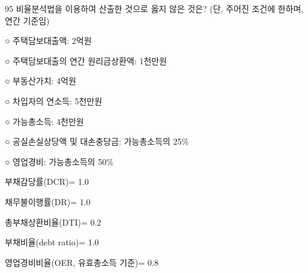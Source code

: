 \begin{question}{95}
비율분석법을 이용하여 산출한 것으로 옳지 않은 것은? (단, 주어진 조건에 한하며, 연간 기준임)
\begin{framedtext}
○ 주택담보대출액: 2억원 \par
○ 주택담보대출의 연간 원리금상환액: 1천만원 \par
○ 부동산가치: 4억원 \par
○ 차입자의 연소득: 5천만원 \par
○ 가능총소득: 4천만원 \par
○ 공실손실상당액 및 대손충당금: 가능총소득의 25\% \par
○ 영업경비: 가능총소득의 50\% \par
\end{framedtext}
\begin{choices}
  \item 부채감당률(DCR)= 1.0
  \item 채무불이행률(DR)= 1.0
  \item 총부채상환비율(DTI)= 0.2
  \item 부채비율(debt ratio)= 1.0
  \item 영업경비비율(OER, 유효총소득 기준)= 0.8
\end{choices}
\end{question}

